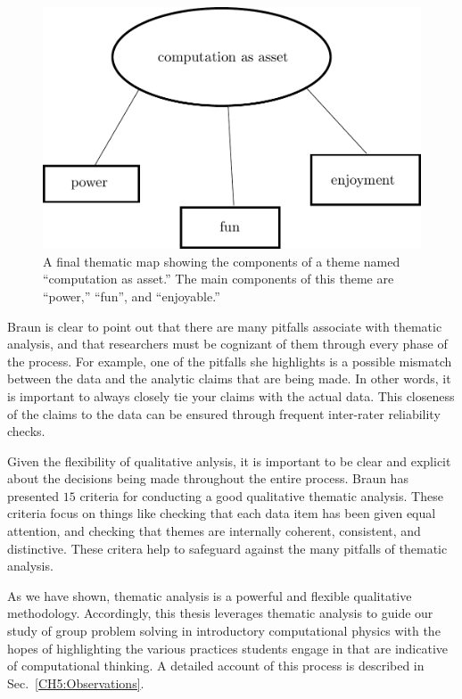 \documentclass{msuphddissertation}
\begin{document}
\begin{doublespace}
\begin{figure}\center
\includegraphics[scale=0.60]{images/CH2Map.pdf}
\caption{A final thematic map showing the components of a theme named ``computation as asset.''  The main components of this theme are ``power,'' ``fun'', and ``enjoyable.''}\label{CH2:Map}
\end{figure}

Braun is clear to point out that there are many pitfalls associate with thematic analysis, and that researchers must be cognizant of them through every phase of the process.  For example, one of the pitfalls she highlights is a possible mismatch between the data and the analytic claims that are being made.  In other words, it is important to always closely tie your claims with the actual data.  This closeness of the claims to the data can be ensured through frequent inter-rater reliability checks.

Given the flexibility of qualitative anlysis, it is important to be clear and explicit about the decisions being made throughout the entire process.  Braun has presented $15$ criteria for conducting a good qualitative thematic analysis.  These criteria focus on things like checking that each data item has been given equal attention, and checking that themes are internally coherent, consistent, and distinctive.  These critera help to safeguard against the many pitfalls of thematic analysis.

As we have shown, thematic analysis is a powerful and flexible qualitative methodology.  Accordingly, this thesis leverages thematic analysis to guide our study of group problem solving in introductory computational physics with the hopes of highlighting the various practices students engage in that are indicative of computational thinking.  A detailed account of this process is described in Sec.~\ref{CH5:Observations}.


\end{doublespace}
\end{document}
